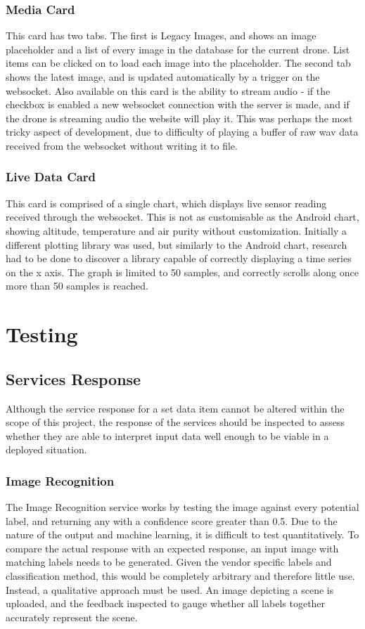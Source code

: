 \documentclass{article}
\begin{document}
\subsubsection{Media Card}
This card has two tabs. The first is Legacy Images, and shows an image placeholder and a list of every image in the database for the current drone. List items can be clicked on to load each image into the placeholder. The second tab shows the latest image, and is updated automatically by a trigger on the websocket. Also available on this card is the ability to stream audio - if the checkbox is enabled a new websocket connection with the server is made, and if the drone is streaming audio the website will play it. This was perhaps the most tricky aspect of development, due to difficulty of playing a buffer of raw wav data received from the websocket without writing it to file.

\subsubsection{Live Data Card}
This card is comprised of a single chart, which displays live sensor reading received through the websocket. This is not as customisable as the Android chart, showing altitude, temperature and air purity without customization. Initially a different plotting library was used, but similarly to the Android chart, research had to be done to discover a library capable of correctly displaying a time series on the x axis. The graph is limited to 50 samples, and correctly scrolls along once more than 50 samples is reached. 



\section{Testing} \label{Testing}

\subsection{Services Response}
Although the service response for a set data item cannot be altered within the scope of this project, the response of the services should be inspected to assess whether they are able to interpret input data well enough to be viable in a deployed situation. 

\subsubsection{Image Recognition}
The Image Recognition service works by testing the image against every potential label, and returning any with a confidence score greater than 0.5. Due to the nature of the output and machine learning, it is difficult to test quantitatively. To compare the actual response with an expected response, an input image with matching labels needs to be generated. Given the vendor specific labels and classification method, this would be completely arbitrary and therefore little use. Instead, a qualitative approach must be used. An image depicting a scene is uploaded, and the feedback inspected to gauge whether all labels together accurately represent the scene. 
\end{document}
